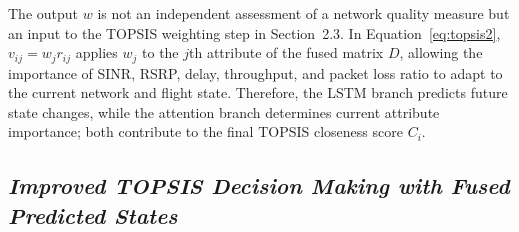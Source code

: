 \documentclass[10pt,a4paper]{article}
\begin{document}
The output $w$ is not an independent assessment of a network quality measure but an input to the TOPSIS weighting step in Section~2.3. In Equation~\eqref{eq:topsis2}, $v_{ij}=w_jr_{ij}$ applies $w_j$ to the $j$th attribute of the fused matrix $D$, allowing the importance of SINR, RSRP, delay, throughput, and packet loss ratio to adapt to the current network and flight state. Therefore, the LSTM branch predicts future state changes, while the attention branch determines current attribute importance; both contribute to the final TOPSIS closeness score $C_i$.

\subsection{\textmd{\textit{Improved TOPSIS Decision Making with Fused Predicted States}}}
\end{document}
